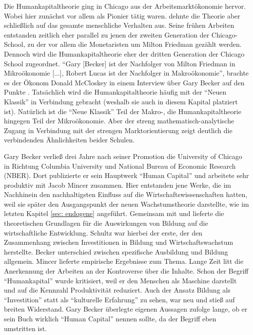 Die Humankapitaltheorie ging in Chicago aus der Arbeitsmarktökonomie hervor. Wobei hier zunächst vor allem  \textcite{Schultz1961} als Pionier \parencite{Becker1992} tätig waren. \textcite{Becker1957, Becker1962} dehnte die Theorie aber schließlich auf das gesamte menschliche Verhalten aus. Seine frühen Arbeiten entstanden zeitlich eher parallel zu jenen der zweiten Generation der Chicago-School, zu der vor allem die Monetaristen um Milton Friedman gezählt werden. Dennoch wird die Humankapitaltheorie eher der dritten Generation der Chicago School zugeordnet. "`Gary [Becker] ist der Nachfolger von Milton Friedman in Mikroökonomie [...], Robert Lucas ist der Nachfolger in Makroökonomie"', brachte es der Ökonom Donald McCloskey in einem Interview über Gary Becker auf den Punkte \parencite[S. 137]{Warsh}. Tatsächlich wird die Humankapitaltheorie häufig mit der "`Neuen Klassik"' in Verbindung gebracht (weshalb sie auch in diesem Kapital platziert ist). Natürlich ist die "`Neue Klassik"' Teil der Makro-, die Humankapitaltheorie hingegen Teil der Mikroökonomie. Aber der streng mathematisch-analytische Zugang in Verbindung mit der strengen Marktorientierung zeigt deutlich die verbindenden Ähnlichkeiten beider Schulen.

Gary Becker verließ drei Jahre nach seiner Promotion die University of Chicago in Richtung Columbia University und National Bureau of Economic Research (NBER). Dort publizierte er sein Hauptwerk "`Human Capital"' \parencite{Becker1964} und arbeitete sehr produktiv mit Jacob Mincer zusammen. Hier entstanden jene Werke, die im Nachhinein den nachhaltigsten Einfluss auf die Wirtschaftswissenschaften hatten, weil sie später den Ausgangspunkt der neuen Wachstumstheorie darstellte, wie im letzten Kapitel \ref{sec: endogene} angeführt. Gemeinsam mit \textcite{Schultz1963} und \textcite{Mincer1974} lieferte \textcite{Becker1962} die theoretischen Grundlagen für die Auswirkungen von Bildung auf die wirtschaftliche Entwicklung. Schultz war hierbei der erste, der den Zusammenhang zwischen Investitionen in Bildung und Wirtschaftswachstum herstellte. Becker unterschied zwischen spezifische Ausbildung und Bildung allgemein. Mincer lieferte empirische Ergebnisse zum Thema.
Lange Zeit litt die Anerkennung der Arbeiten an der Kontroverse über die Inhalte. Schon der Begriff "`Humankapital"' wurde kritisiert, weil er den Menschen als Maschine darstellt und auf die Kennzahl Produktivität reduziert. Auch der Ansatz Bildung als "`Investition"' statt als "`kulturelle Erfahrung"' zu sehen, war neu und stieß auf breiten Widerstand. Gary Becker überlegte eigenen Aussagen zufolge lange, ob er sein Buch wirklich "`Human Capital"' nennen sollte, da der Begriff eben umstritten ist.

